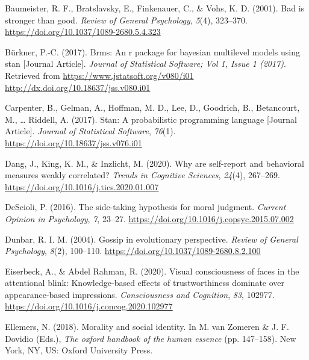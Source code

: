 \documentclass[
  man]{apa6}
\newlength{\cslhangindent}
\newlength{\cslentryspacingunit} %
\newenvironment{CSLReferences}[2] %
 {%
  \setlength{\parindent}{0pt}
  \ifodd #1
  \let\oldpar\par
  \def\par{\hangindent=\cslhangindent\oldpar}
  \fi
  \setlength{\parskip}{#2\cslentryspacingunit}
 }%
 {}
\begin{document}
\begin{CSLReferences}{1}{0}
\leavevmode{}%
Baumeister, R. F., Bratslavsky, E., Finkenauer, C., \& Vohs, K. D. (2001). Bad is stronger than good. \emph{Review of General Psychology}, \emph{5}(4), 323--370. \url{https://doi.org/10.1037/1089-2680.5.4.323}

\leavevmode{}%
Bürkner, P.-C. (2017). Brms: An r package for bayesian multilevel models using stan {[}Journal Article{]}. \emph{Journal of Statistical Software; Vol 1, Issue 1 (2017)}. Retrieved from \href{https://www.jstatsoft.org/v080/i01\%0Ahttp://dx.doi.org/10.18637/jss.v080.i01}{https://www.jstatsoft.org/v080/i01
http://dx.doi.org/10.18637/jss.v080.i01}

\leavevmode{}%
Carpenter, B., Gelman, A., Hoffman, M. D., Lee, D., Goodrich, B., Betancourt, M., \ldots{} Riddell, A. (2017). Stan: A probabilistic programming language {[}Journal Article{]}. \emph{Journal of Statistical Software}, \emph{76}(1). \url{https://doi.org/10.18637/jss.v076.i01}

\leavevmode{}%
Dang, J., King, K. M., \& Inzlicht, M. (2020). Why are self-report and behavioral measures weakly correlated? \emph{Trends in Cognitive Sciences}, \emph{24}(4), 267--269. \url{https://doi.org/10.1016/j.tics.2020.01.007}

\leavevmode{}%
DeScioli, P. (2016). The side-taking hypothesis for moral judgment. \emph{Current Opinion in Psychology}, \emph{7}, 23--27. \url{https://doi.org/10.1016/j.copsyc.2015.07.002}

\leavevmode{}%
Dunbar, R. I. M. (2004). Gossip in evolutionary perspective. \emph{Review of General Psychology}, \emph{8}(2), 100--110. \url{https://doi.org/10.1037/1089-2680.8.2.100}

\leavevmode{}%
Eiserbeck, A., \& Abdel Rahman, R. (2020). Visual consciousness of faces in the attentional blink: Knowledge-based effects of trustworthiness dominate over appearance-based impressions. \emph{Consciousness and Cognition}, \emph{83}, 102977. \url{https://doi.org/10.1016/j.concog.2020.102977}

\leavevmode{}%
Ellemers, N. (2018). Morality and social identity. In M. van Zomeren \& J. F. Dovidio (Eds.), \emph{The oxford handbook of the human essence} (pp. 147--158). New York, {NY}, {US}: Oxford University Press.


\end{CSLReferences}
\end{document}
